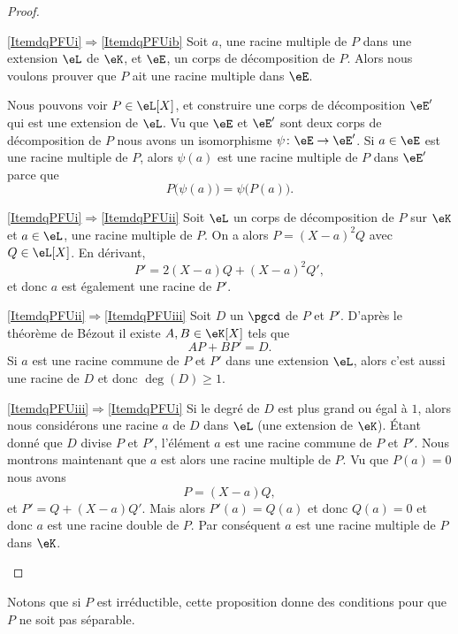 \begin{proof}
    \begin{subproof}
    \item[\ref{ItemdqPFUi}\( \Rightarrow\)\ref{ItemdqPFUib}] Soit \( a\), une racine multiple de \( P\) dans une extension \( \eL\) de \( \eK\), et \( \eE\), un corps de décomposition de \( P\). Alors nous voulons prouver que \( P\) ait une racine multiple dans \( \eE\).

        Nous pouvons voir \( P\in \eL[X]\), et construire une corps de décomposition \( \eE'\) qui est une extension de \( \eL\). Vu que \( \eE\) et \( \eE'\) sont deux corps de décomposition de \( P\) 
        nous avons un isomorphisme \( \psi\colon \eE\to \eE'\). Si \( a\in \eE\) est une racine multiple de \( P\), alors \( \psi(a)\) est une racine multiple de \( P\) dans \( \eE'\) parce que
        \begin{equation}
            P\big( \psi(a) \big)=\psi\big( P(a) \big).
        \end{equation}
    \item[\ref{ItemdqPFUi}\( \Rightarrow\)\ref{ItemdqPFUii}] Soit \( \eL\) un corps de décomposition de \( P\) sur \( \eK\) et \( a\in \eL\), une racine multiple de \( P\). On a alors \( P=(X-a)^2Q\) avec \( Q\in \eL[X]\). En dérivant,
        \begin{equation}
            P'=2(X-a)Q+(X-a)^2Q',
        \end{equation}
        et donc \( a\) est également une racine de \( P'\).
    \item[\ref{ItemdqPFUii}\( \Rightarrow\)\ref{ItemdqPFUiii}] Soit \( D\) un \( \pgcd\) de \( P\) et \( P'\). D'après le théorème de Bézout il existe \( A,B\in \eK[X]\) tels que 
        \begin{equation}
            AP+BP'=D.
        \end{equation}
        Si \( a\) est une racine commune de \( P\) et \( P'\) dans une extension \( \eL\), alors c'est aussi une racine de \( D\) et donc \( \deg(D)\geq 1\).
    \item[\ref{ItemdqPFUiii}\(\Rightarrow\)\ref{ItemdqPFUi}] Si le degré de \( D\) est plus grand ou égal à \( 1\), alors nous considérons une racine \( a\) de \( D\) dans \( \eL\) (une extension de \( \eK\)). Étant donné que \( D\) divise \( P\) et \( P'\), l'élément \( a\) est une racine commune de \( P\) et \( P'\). Nous montrons maintenant que \( a\) est alors une racine multiple de \( P\). Vu que \( P(a)=0\) nous avons
        \begin{equation}
            P=(X-a)Q,
        \end{equation}
        et \( P'=Q+(X-a)Q'\). Mais alors \( P'(a)=Q(a)\) et donc \( Q(a)=0\) et donc \( a\) est une racine double de \( P\). Par conséquent \( a\) est une racine multiple de \( P\) dans \( \eK\).
    \end{subproof}
\end{proof}
Notons que si \( P\) est irréductible, cette proposition donne des conditions pour que \( P\) ne soit pas séparable.

